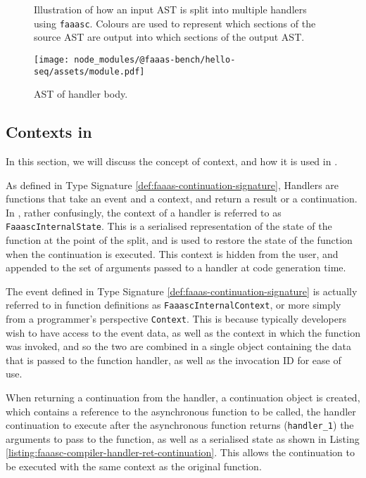 \begin{figure*}
    \fontsize{8}{10}\selectfont
    \centering
    
    \caption{Illustration of how an input AST is split into multiple handlers using \texttt{faaasc}. Colours are used to represent which sections of the source AST are output into which sections of the output AST.}
    \label{fig:faaasc-split-ast-mapping}
\end{figure*}

\begin{figure}
    \texttt{[image: node\_modules/@faaas-bench/hello-seq/assets/module.pdf]}
    \caption{AST of handler body.}
    \label{fig:suites-hello-seq-module-ast}
\end{figure}

\subsection{Contexts in \faaasc{}}
In this section, we will discuss the concept of context, and how it is used in \faaasc{}.

As defined in Type Signature \ref{def:faaas-continuation-signature}, Handlers are functions that take an event and a context, and return a result or a continuation. In \faaasc{}, rather confusingly, the context of a handler is referred to as \verb|FaaascInternalState|. This is a serialised representation of the state of the function at the point of the split, and is used to restore the state of the function when the continuation is executed. This context is hidden from the user, and appended to the set of arguments passed to a handler at code generation time.

The event defined in Type Signature \ref{def:faaas-continuation-signature} is actually referred to in function definitions as \verb|FaaascInternalContext|, or more simply from a programmer's perspective \verb|Context|. This is because typically developers wish to have access to the event data, as well as the context in which the function was invoked, and so the two are combined in a single object containing the data that is passed to the function handler, as well as the invocation ID for ease of use.

When returning a continuation from the handler, a continuation object is created, which contains a reference to the asynchronous function to be called, the handler continuation to execute after the asynchronous function returns (\verb|handler_1|) the arguments to pass to the function, as well as a serialised state as shown in Listing \ref{listing:faaasc-compiler-handler-ret-continuation}. This allows the continuation to be executed with the same context as the original function.

